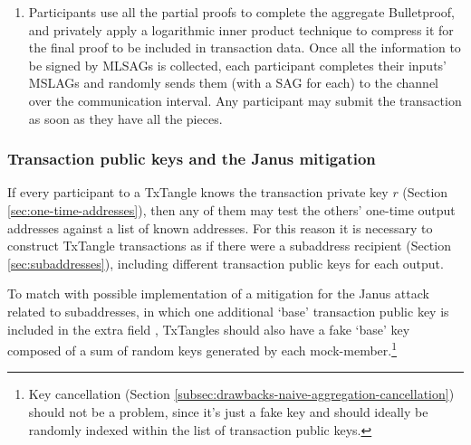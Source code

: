 \begin{enumerate}
    \item Participants use all the partial proofs to complete the aggregate Bulletproof, and privately apply a logarithmic inner product technique to compress it for the final proof to be included in transaction data. Once all the information to be signed by MLSAGs is collected, each participant completes their inputs' MSLAGs and randomly sends them (with a SAG for each) to the channel over the communication interval. Any participant may submit the transaction as soon as they have all the pieces.
\end{enumerate}{}

\subsubsection*{Transaction public keys and the Janus mitigation}

If every participant to a TxTangle knows the transaction private key $r$ (Section \ref{sec:one-time-addresses}), then any of them may test the others' one-time output addresses against a list of known addresses. For this reason it is necessary to construct TxTangle transactions as if there were a subaddress recipient (Section \ref{sec:subaddresses}), including different transaction public keys for each output.

To match with possible implementation of a mitigation for the Janus attack related to subaddresses, in which one additional `base' transaction public key is included in the extra field \cite{janus-mitigation-issue-62}, TxTangles should also have a fake `base' key composed of a sum of random keys generated by each mock-member.\footnote{Key cancellation (Section \ref{subsec:drawbacks-naive-aggregation-cancellation}) should not be a problem, since it's just a fake key and should ideally be randomly indexed within the list of transaction public keys.}

